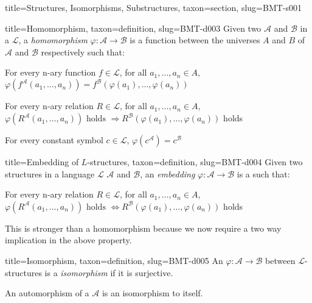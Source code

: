 \documentclass[a4paper]{article}
\begin{document}
\begin{tree}{title={Structures, Isomorphisms, Substructures}, taxon={section}, slug={BMT-s001}}
\begin{tree}{title={Homomorphism}, taxon={definition}, slug={BMT-d003}}
Given two  \(\mathcal {A}\) and \(\mathcal {B}\) in a  \(\mathcal {L}\), a \emph{homomorphism} \(\varphi :  \mathcal {A}  \rightarrow   \mathcal {B}\)
is a function between the universes \(A\) and \(B\) of \(\mathcal {A}\) and \(\mathcal {B}\) respectively such that:\par{ For every n-ary function \(f \in   \mathcal {L}\), for all \(a_1, \dots , a_n \in  A\), \(\varphi (f^{ \mathcal {A}}(a_1, \dots , a_n)) = f^{ \mathcal {B}}( \varphi (a_1), \dots ,  \varphi (a_n))\)}\par{For every n-ary relation \(R \in   \mathcal {L}\), for all \(a_1, \dots , a_n  \in  A\), \(\varphi (R^{ \mathcal {A}}(a_1, \dots , a_n))  \text { holds }  \Rightarrow  R^{ \mathcal {B}}( \varphi (a_1),  \dots ,  \varphi (a_n))\) holds}\par{For every constant symbol \(c  \in   \mathcal {L}\), \(\varphi (c^{ \mathcal {A}}) =c^{ \mathcal {B}}\)}
\end{tree}

\begin{tree}{title={Embedding of \(L\)-structures}, taxon={definition}, slug={BMT-d004}}
Given two structures in a language \(\mathcal {L}\) \(\mathcal {A}\) and \(\mathcal {B}\), an \emph{embedding} \(\varphi :  \mathcal {A}  \rightarrow   \mathcal {B}\)
is a  such that:\par{For every n-ary relation \(R \in   \mathcal {L}\), for all \(a_1, \dots , a_n  \in  A\), \(\varphi (R^{ \mathcal {A}}(a_1, \dots , a_n))  \text { holds }  \Leftrightarrow  R^{ \mathcal {B}}( \varphi (a_1),  \dots ,  \varphi (a_n))\) holds}\par{This is stronger than a homomorphism because we now require a two way implication in the above property.}
\end{tree}

\begin{tree}{title={Isomorphism}, taxon={definition}, slug={BMT-d005}}
An  \(\varphi :  \mathcal {A}  \rightarrow   \mathcal {B}\) between \(\mathcal {L}\)-structures is a \emph{isomorphism} if it is surjective.

An automorphism of a  \(\mathcal {A}\) is an isomorphism to itself.

\end{tree}


\end{tree}
\end{document}
